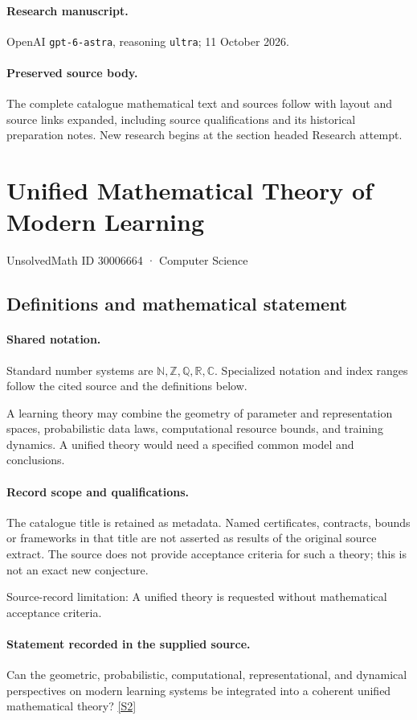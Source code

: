 \documentclass[11pt]{article}
\begin{document}
\paragraph{Research manuscript.} OpenAI \texttt{gpt-6-astra}, reasoning \texttt{ultra}; 11 October 2026.
\paragraph{Preserved source body.} The complete catalogue mathematical text and sources follow with layout and source links expanded, including source qualifications and its historical preparation notes. New research begins at the section headed Research attempt.

\section{Unified Mathematical Theory of Modern Learning}\label{30006664}
{\small UnsolvedMath ID 30006664 · Computer Science}
\subsection{Definitions and mathematical statement}

\paragraph{Shared notation.}Standard number systems are $\mathbb N,\mathbb Z,\mathbb Q,\mathbb R,\mathbb C$. Specialized notation and index ranges follow the cited source and the definitions below.


A learning theory may combine the geometry of parameter and representation spaces, probabilistic data laws, computational resource bounds, and training dynamics. A unified theory would need a specified common model and conclusions.
\paragraph{Record scope and qualifications.}
The catalogue title is retained as metadata. Named certificates, contracts, bounds or frameworks in that title are not asserted as results of the original source extract.
The source does not provide acceptance criteria for such a theory; this is not an exact new conjecture.

Source-record limitation: A unified theory is requested without mathematical acceptance criteria.
\paragraph{Statement recorded in the supplied source.}
Can the geometric, probabilistic, computational, representational, and dynamical perspectives on modern learning systems be integrated into a coherent unified mathematical theory? \href{https://doi.org/10.4171/owr/2026/11}{[S2]}
\end{document}
